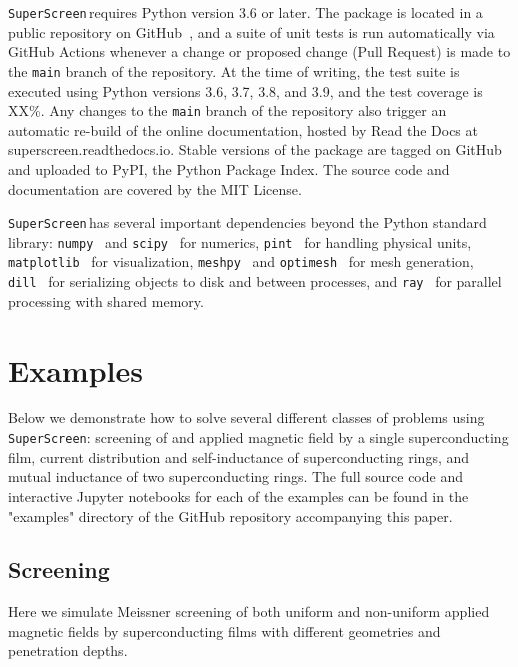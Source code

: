 \documentclass[preprint,12pt]{elsarticle}
\newcommand{\SuperScreen}{\texttt{SuperScreen}\,}
\begin{document}
\SuperScreen requires Python version 3.6 or later. The package is located in a public repository on GitHub~\cite{superscreen}, and a suite of unit tests is run automatically via GitHub Actions whenever a change or proposed change (Pull Request) is made to the \texttt{main} branch of the repository. At the time of writing, the test suite is executed using Python versions 3.6, 3.7, 3.8, and 3.9, and the test coverage is XX\%. Any changes to the \texttt{main} branch of the repository also trigger an automatic re-build of the online documentation, hosted by Read the Docs at superscreen.readthedocs.io. Stable versions of the package are tagged on GitHub and uploaded to PyPI, the Python Package Index. The source code and documentation are covered by the MIT License.

\SuperScreen has several important dependencies beyond the Python standard library: \texttt{numpy}~\cite{2020NumPy-Array} and \texttt{scipy}~\cite{2020SciPy-NMeth} for numerics, \texttt{pint}~\cite{Grecco} for handling physical units, \texttt{matplotlib}~\cite{Hunter_2007} for visualization, \texttt{meshpy}~\cite{Klockner,Shewchuk} and \texttt{optimesh}~\cite{nico_schlomer_adam_dobrawy_2021} for mesh generation, \texttt{dill}~\cite{McKerns} for serializing objects to disk and between processes, and \texttt{ray}~\cite{ray_2018} for parallel processing with shared memory.

\section{Examples}
\label{section:examples}

Below we demonstrate how to solve several different classes of problems using \texttt{SuperScreen}: screening of and applied magnetic field by a single superconducting film, current distribution and self-inductance of superconducting rings, and mutual inductance of two superconducting rings. The full source code and interactive Jupyter notebooks for each of the examples can be found in the "examples" directory of the GitHub repository accompanying this paper.

\subsection{Screening}
\label{section:example:screening}

Here we simulate Meissner screening of both uniform and non-uniform applied magnetic fields by superconducting films with different geometries and penetration depths. 
\end{document}
